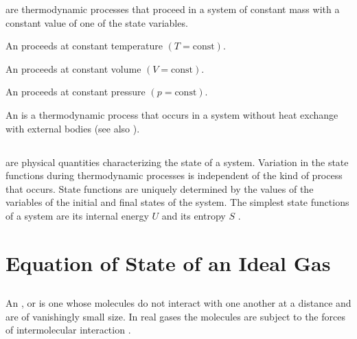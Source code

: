  are thermodynamic processes that proceed in a system of constant mass with a constant value of one of the state variables.

An  proceeds at constant temperature $(T = \textrm{const})$.

An  proceeds at constant volume $(V = \textrm{const})$.

An  proceeds at constant pressure $(p = \textrm{const})$. 

An  is a thermodynamic process that occurs in a system without heat exchange  with external bodies (see also ).

\subsection{}\label{8.3.8}  are physical quantities characterizing the state of a system. Variation in the state functions during ther­modynamic processes is independent of the kind of process that occurs. State functions are uniquely determined by the values of the variables of the initial and final states of the system. The simplest state functions of a system are its inter­nal energy $U$  and its entropy $S$ .

\section{Equation of State of an Ideal Gas}
\label{sec-8.4}

\subsection{}\label{8.4.1} An , or  is one whose molecules do not interact with one another at a distance and are of vanishingly small size. In real gases  the molecules are subject to the forces of intermolecular interaction .

